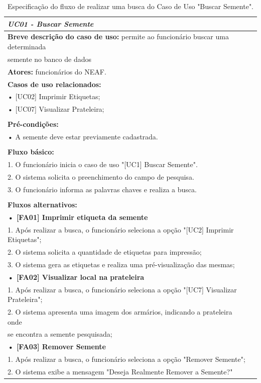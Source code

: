 \documentclass[12pt,a4paper]{article}
\begin{document}
\begin{table}[H]
\caption{Especificação do fluxo de realizar uma busca do Caso de Uso "Buscar Semente".}
\centering
\label{tabela:UC1}
\begin{tabular}{|l|c|}
\hline 
{ \it UC01 - Buscar Semente} \\ 
\hline 
{\bf Breve descrição do caso de uso:} permite ao funcionário buscar uma determinada\\ semente no banco de dados \\
{\bf Atores:} funcionários do NEAF.\\
{\bf Casos de uso relacionados:}\\
• [UC02] Imprimir Etiquetas;\\
• [UC07] Visualizar Prateleira;\\\\
{\bf Pré-condições:}\\
• A semente deve estar previamente cadastrada.
\\\\
{\bf Fluxo básico:}\\
1. O funcionário inicia o caso de uso "[UC1] Buscar Semente".\\
2. O sistema solicita o preenchimento do campo de pesquisa.\\
3. O funcionário informa as palavras chaves e realiza a busca.\\
\\
{\bf Fluxos alternativos:}\\
{\bf • [FA01] Imprimir etiqueta da semente}\\
	1. Após realizar a busca, o funcionário seleciona a opção "[UC2] Imprimir Etiquetas";\\
	2. O sistema solicita a quantidade de etiquetas para impressão;\\
	3. O sistema gera as etiquetas e realiza uma pré-visualização das mesmas;\\
{\bf • [FA02] Visualizar local na prateleira}\\
1. Após realizar a busca,  o funcionário seleciona a opção "[UC7] Visualizar Prateleira";\\
2. O sistema apresenta uma imagem dos armários, indicando a prateleira onde \\ se encontra a semente pesquisada;\\ 
{\bf • [FA03] Remover Semente}\\
1. Após realizar a busca,  o funcionário seleciona a opção "Remover Semente";\\
2. O sistema exibe a mensagem "Deseja Realmente Remover a Semente?"\\

\end{tabular}
\end{table}
\end{document}
